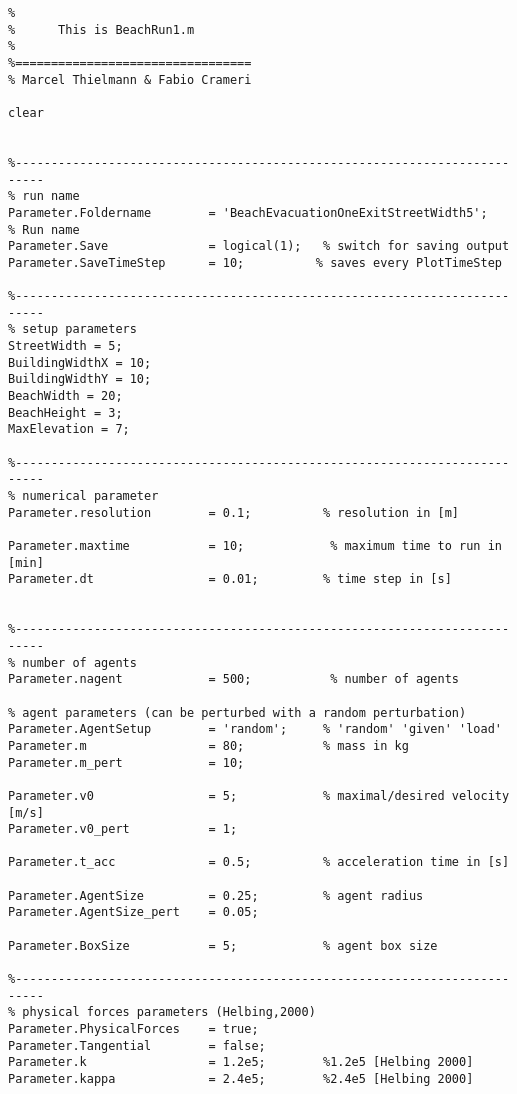 \lstset{basicstyle=\footnotesize\ttfamily}
    
\begin{lstlisting}[breaklines]
%=================================
%
%      This is BeachRun1.m
% 
%=================================
% Marcel Thielmann & Fabio Crameri

clear


%--------------------------------------------------------------------------
% run name
Parameter.Foldername        = 'BeachEvacuationOneExitStreetWidth5';      % Run name
Parameter.Save              = logical(1);   % switch for saving output
Parameter.SaveTimeStep      = 10;          % saves every PlotTimeStep

%--------------------------------------------------------------------------
% setup parameters
StreetWidth = 5;
BuildingWidthX = 10;
BuildingWidthY = 10;
BeachWidth = 20;
BeachHeight = 3;
MaxElevation = 7;

%--------------------------------------------------------------------------
% numerical parameter
Parameter.resolution        = 0.1;          % resolution in [m]

Parameter.maxtime           = 10;            % maximum time to run in [min]
Parameter.dt                = 0.01;         % time step in [s]


%--------------------------------------------------------------------------
% number of agents
Parameter.nagent            = 500;           % number of agents

% agent parameters (can be perturbed with a random perturbation)
Parameter.AgentSetup        = 'random';     % 'random' 'given' 'load'
Parameter.m                 = 80;           % mass in kg
Parameter.m_pert            = 10;

Parameter.v0                = 5;            % maximal/desired velocity [m/s]
Parameter.v0_pert           = 1;   

Parameter.t_acc             = 0.5;        	% acceleration time in [s]

Parameter.AgentSize         = 0.25;         % agent radius
Parameter.AgentSize_pert    = 0.05; 

Parameter.BoxSize           = 5;            % agent box size

%--------------------------------------------------------------------------
% physical forces parameters (Helbing,2000)
Parameter.PhysicalForces    = true;
Parameter.Tangential        = false;
Parameter.k                 = 1.2e5;        %1.2e5 [Helbing 2000]
Parameter.kappa             = 2.4e5;        %2.4e5 [Helbing 2000]


\end{lstlisting}
